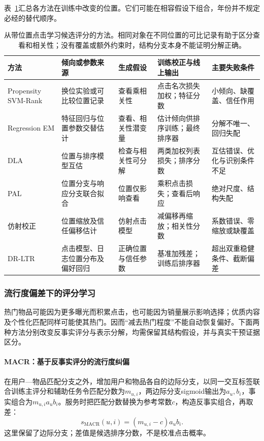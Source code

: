 表~\ref{tab:rs-position-methods}汇总各方法在训练中改变的位置。它们可能在相容假设下组合，年份并不规定必经的替代顺序。
\begin{table}[htbp]
 \centering\small
 \begin{tabularx}{\linewidth}{@{}lXXXX@{}}
 \toprule
 方法 & 倾向或参数来源 & 生成假设 & 训练校正与线上输出 & 主要失败条件\\
 \midrule
 Propensity SVM-Rank & 换位实验或可比较位置记录 & 查看乘相关性 & 点击名次损失加权；特征分数 & 小倾向、缺覆盖、信任作用\\
 Regression EM & 特征回归与位置参数交替估计 & 查看、相关性潜变量 & 估计倾向供排序训练；最终排序器 & 分解不唯一、回归失配\\
 DLA & 位置与排序模型互估 & 检查与相关性可分解 & 两类加权列表损失；排序分数 & 互估错误、优化与识别条件不足\\
 PAL & 位置分支与响应分支联合拟合 & 位置仅影响查看 & 乘积点击损失；查看后响应 & 绝对尺度、结构失配\\
 仿射校正 & 位置缩放及信任偏移估计 & 仿射点击模型 & 减偏移再缩放；相关性分数 & 系数错误、零缩放或缺覆盖\\
 DR-LTR & 点击模型、日志位置分布及偏好回归 & 正确位置与信任参数 & 基准加残差；训练后排序器 & 超出双重稳健条件、截断偏差\\
 \bottomrule
 \end{tabularx}
 \caption{从带位置点击学习候选评分的方法。相同对象在不同位置的可比记录有助于区分查看和相关性；没有覆盖或额外约束时，结构分支本身不能证明分解正确。}
 \label{tab:rs-position-methods}
\end{table}

\subsubsection{流行度偏差下的评分学习}
\label{sec:rs-popularity-bias}

热门物品可能因为更多曝光而积累点击，也可能因为销量展示影响选择；优质内容及个性化匹配同样可能使其热门。因而“减去热门程度”不能自动恢复偏好。下面两种方法分别改变反事实评分与表示分解，均需保留其结构假设，并与真实干预证据区分。

\paragraph{MACR：基于反事实评分的流行度纠偏}
\label{sec:rs-macr}

在用户—物品匹配分支之外，增加用户和物品各自的边际分支，以同一交互标签联合训练主评分和辅助任务令匹配分数为$m_{u,i}$，两边际分支sigmoid输出为$a_u,b_i$，事实组合为$m_{u,i}a_ub_i$。服务时把匹配分数替换为参考常数$c$，构造反事实组合，再取差：
\begin{equation}
 s_{\mathrm{MACR}}(u,i)=(m_{u,i}-c)a_ub_i.
 \label{eq:rs-macr}
\end{equation}
这里保留了边际分支；差值是候选排序分数，不是校准点击概率。

